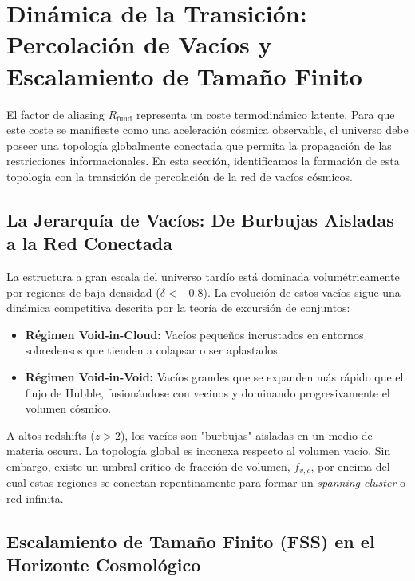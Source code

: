 \documentclass[12pt, a4paper]{article}
\theoremstyle{plain}
\theoremstyle{definition}
\begin{document}
\section{Dinámica de la Transición: Percolación de Vacíos y Escalamiento de Tamaño Finito}
\label{sec:percolacion}

El factor de aliasing $R_{\text{fund}}$ representa un coste termodinámico latente. Para que este coste se manifieste como una aceleración cósmica observable, el universo debe poseer una topología globalmente conectada que permita la propagación de las restricciones informacionales. En esta sección, identificamos la formación de esta topología con la transición de percolación de la red de vacíos cósmicos.

\subsection{La Jerarquía de Vacíos: De Burbujas Aisladas a la Red Conectada}

La estructura a gran escala del universo tardío está dominada volumétricamente por regiones de baja densidad ($\delta < -0.8$). La evolución de estos vacíos sigue una dinámica competitiva descrita por la teoría de excursión de conjuntos:
\begin{itemize}
    \item \textbf{Régimen Void-in-Cloud:} Vacíos pequeños incrustados en entornos sobredensos que tienden a colapsar o ser aplastados.
    \item \textbf{Régimen Void-in-Void:} Vacíos grandes que se expanden más rápido que el flujo de Hubble, fusionándose con vecinos y dominando progresivamente el volumen cósmico.
\end{itemize}

A altos redshifts ($z > 2$), los vacíos son "burbujas" aisladas en un medio de materia oscura. La topología global es inconexa respecto al volumen vacío. Sin embargo, existe un umbral crítico de fracción de volumen, $f_{v,c}$, por encima del cual estas regiones se conectan repentinamente para formar un \textit{spanning cluster} o red infinita.

\subsection{Escalamiento de Tamaño Finito (FSS) en el Horizonte Cosmológico}
\end{document}
